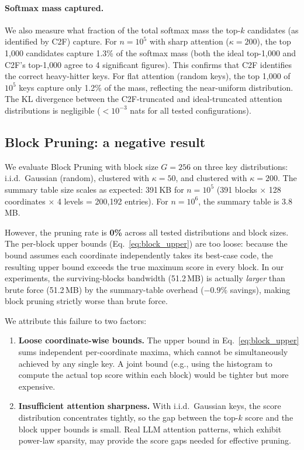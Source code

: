 \documentclass[10pt,twocolumn]{article}
\theoremstyle{definition}
\begin{document}
\paragraph{Softmax mass captured.}
We also measure what fraction of the total softmax mass the top-$k$ candidates
(as identified by C2F) capture.  For $n = 10^5$ with sharp attention ($\kappa =
200$), the top 1{,}000 candidates capture 1.3\% of the softmax mass (both the
ideal top-1{,}000 and C2F's top-1{,}000 agree to 4 significant figures).  This
confirms that C2F identifies the correct heavy-hitter keys.  For flat attention
(random keys), the top 1{,}000 of $10^5$ keys capture only 1.2\% of the mass,
reflecting the near-uniform distribution.  The KL divergence between the
C2F-truncated and ideal-truncated attention distributions is negligible
($< 10^{-3}$ nats for all tested configurations).

\subsection{Block Pruning: a negative result}
\label{sec:exp_block_pruning}

We evaluate Block Pruning with block size $G = 256$ on three key distributions:
i.i.d.\ Gaussian (random), clustered with $\kappa = 50$, and clustered with
$\kappa = 200$.  The summary table size scales as expected: 391\,KB for
$n = 10^5$ (391 blocks $\times$ 128 coordinates $\times$ 4 levels = 200{,}192
entries).  For $n = 10^6$, the summary table is 3.8\,MB.

However, the pruning rate is \textbf{0\%} across all tested distributions and
block sizes.  The per-block upper bounds (Eq.~\ref{eq:block_upper}) are too
loose: because the bound assumes each coordinate independently takes its
best-case code, the resulting upper bound exceeds the true maximum score in
every block.  In our experiments, the surviving-blocks bandwidth (51.2\,MB) is
actually \emph{larger} than brute force (51.2\,MB) by the summary-table overhead
($-0.9\%$ savings), making block pruning strictly worse than brute force.

We attribute this failure to two factors:
\begin{enumerate}[nosep]
  \item \textbf{Loose coordinate-wise bounds.}  The upper bound in
        Eq.~\eqref{eq:block_upper} sums independent per-coordinate maxima,
        which cannot be simultaneously achieved by any single key.  A joint
        bound (e.g., using the histogram to compute the actual top score within
        each block) would be tighter but more expensive.
  \item \textbf{Insufficient attention sharpness.}  With i.i.d.\ Gaussian keys,
        the score distribution concentrates tightly, so the gap between the
        top-$k$ score and the block upper bounds is small.  Real LLM attention
        patterns, which exhibit power-law sparsity, may provide the score gaps
        needed for effective pruning.
\end{enumerate}
\end{document}
